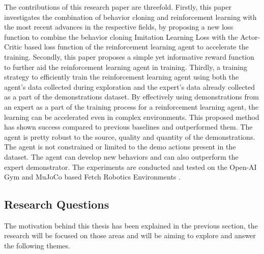 The contributions of this research paper are threefold. Firstly, this paper investigates the combination of behavior cloning and reinforcement learning with the most recent advances in the respective fields, by proposing a new loss function to combine the behavior cloning Imitation Learning Loss \cite{goecks2020integrating} \cite{nair2018overcoming} with the Actor-Critic based loss function \cite{lillicrap2019continuous} \cite{fujimoto2018addressing} of the reinforcement learning agent to accelerate the training. Secondly, this paper proposes a simple yet informative reward function to further aid the reinforcement learning agent in training. Thirdly, a training strategy to efficiently train the reinforcement learning agent using both the agent's data collected during exploration and the expert's data already collected as a part of the demonstrations dataset. By effectively using demonstrations from an expert as a part of the training process for a reinforcement learning agent, the learning can be accelerated even in complex environments. This proposed method has shown success compared to previous baselines and outperformed them. The agent is pretty robust to the source, quality and quantity of the demonstrations. The agent is not constrained or limited to the demo actions present in the dataset. The agent can develop new behaviors and can also outperform the expert demonstrator. The experiments are conducted and tested on the Open-AI Gym \cite{brockman2016openai} and MuJoCo \cite{MJC} based Fetch Robotics Environments \cite{plappert2018multigoal}. \\

\subsection{Research Questions}

The motivation behind this thesis has been explained in the previous section, the research will be focused on those areas and will be aiming to explore and answer the following themes. \\

